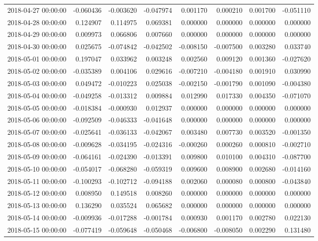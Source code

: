 \begin{tabular}{lrrrrrrr}
2018-04-27 00:00:00 & -0.060436 & -0.003620 & -0.047974 & 0.001170 & 0.000210 & 0.001700 & -0.051110 \\
2018-04-28 00:00:00 & 0.124907 & 0.114975 & 0.069381 & 0.000000 & 0.000000 & 0.000000 & 0.000000 \\
2018-04-29 00:00:00 & 0.009973 & 0.066806 & 0.007660 & 0.000000 & 0.000000 & 0.000000 & 0.000000 \\
2018-04-30 00:00:00 & 0.025675 & -0.074842 & -0.042502 & -0.008150 & -0.007500 & 0.003280 & 0.033740 \\
2018-05-01 00:00:00 & 0.197047 & 0.033962 & 0.003248 & 0.002560 & 0.009120 & 0.001360 & -0.027620 \\
2018-05-02 00:00:00 & -0.035389 & 0.004106 & 0.029616 & -0.007210 & -0.004180 & 0.001910 & 0.030990 \\
2018-05-03 00:00:00 & 0.049472 & -0.010223 & 0.025038 & -0.002150 & -0.001790 & 0.001090 & -0.004380 \\
2018-05-04 00:00:00 & -0.049258 & -0.013312 & 0.009884 & 0.012990 & 0.017330 & 0.004350 & -0.071070 \\
2018-05-05 00:00:00 & -0.018384 & -0.000930 & 0.012937 & 0.000000 & 0.000000 & 0.000000 & 0.000000 \\
2018-05-06 00:00:00 & -0.092509 & -0.046333 & -0.041648 & 0.000000 & 0.000000 & 0.000000 & 0.000000 \\
2018-05-07 00:00:00 & -0.025641 & -0.036133 & -0.042067 & 0.003480 & 0.007730 & 0.003520 & -0.001350 \\
2018-05-08 00:00:00 & -0.009628 & -0.034195 & -0.024316 & -0.000260 & 0.000260 & 0.000810 & -0.002710 \\
2018-05-09 00:00:00 & -0.064161 & -0.024390 & -0.013391 & 0.009800 & 0.010100 & 0.004310 & -0.087700 \\
2018-05-10 00:00:00 & -0.054017 & -0.068280 & -0.059319 & 0.009600 & 0.008900 & 0.002680 & -0.014160 \\
2018-05-11 00:00:00 & -0.100293 & -0.102712 & -0.094188 & 0.002060 & 0.000080 & 0.000800 & -0.043840 \\
2018-05-12 00:00:00 & 0.008950 & 0.149518 & 0.008260 & 0.000000 & 0.000000 & 0.000000 & 0.000000 \\
2018-05-13 00:00:00 & 0.136290 & 0.035524 & 0.065682 & 0.000000 & 0.000000 & 0.000000 & 0.000000 \\
2018-05-14 00:00:00 & -0.009936 & -0.017288 & -0.001784 & 0.000930 & 0.001170 & 0.002780 & 0.022130 \\
2018-05-15 00:00:00 & -0.077419 & -0.059648 & -0.050468 & -0.006800 & -0.008050 & 0.002290 & 0.131480 \\

\end{tabular}
